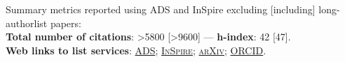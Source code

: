 Summary metrics reported using ADS and InSpire excluding [including] long-authorlist papers:
\\
\textcolor{mark_color}{\textbf{Total number of citations}}: >5800 [>9600]
 --- 
\textcolor{mark_color}{\textbf{h-index}}: 42 [47].
\\
\textcolor{mark_color}{\textbf{Web links to list services}}:
\href{https://davidegerosa.com/myads}{\textsc{ADS}};
\href{https://davidegerosa.com/myinspire}{\textsc{InSpire}};
\href{http://davidegerosa.com/myarxiv}{\textsc{arXiv}};
\href{https://davidegerosa.com/myorcid}{\textsc{ORCID}}.